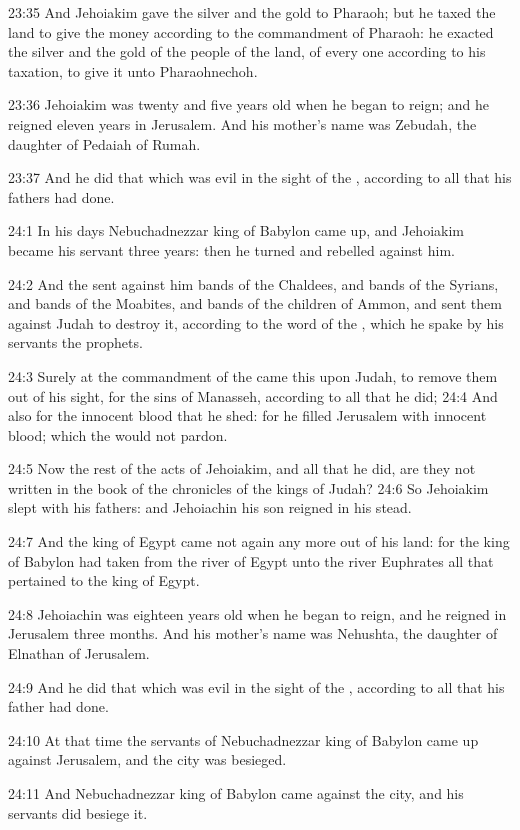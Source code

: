 23:35 And Jehoiakim gave the silver and the gold to Pharaoh; but he
taxed the land to give the money according to the commandment of
Pharaoh: he exacted the silver and the gold of the people of the land,
of every one according to his taxation, to give it unto Pharaohnechoh.

23:36 Jehoiakim was twenty and five years old when he began to reign;
and he reigned eleven years in Jerusalem. And his mother's name was
Zebudah, the daughter of Pedaiah of Rumah.

23:37 And he did that which was evil in the sight of the \LORD,
according to all that his fathers had done.

24:1 In his days Nebuchadnezzar king of Babylon came up, and Jehoiakim
became his servant three years: then he turned and rebelled against
him.

24:2 And the \LORD sent against him bands of the Chaldees, and bands of
the Syrians, and bands of the Moabites, and bands of the children of
Ammon, and sent them against Judah to destroy it, according to the
word of the \LORD, which he spake by his servants the prophets.

24:3 Surely at the commandment of the \LORD came this upon Judah, to
remove them out of his sight, for the sins of Manasseh, according to
all that he did; 24:4 And also for the innocent blood that he shed:
for he filled Jerusalem with innocent blood; which the \LORD would not
pardon.

24:5 Now the rest of the acts of Jehoiakim, and all that he did, are
they not written in the book of the chronicles of the kings of Judah?
24:6 So Jehoiakim slept with his fathers: and Jehoiachin his son
reigned in his stead.

24:7 And the king of Egypt came not again any more out of his land:
for the king of Babylon had taken from the river of Egypt unto the
river Euphrates all that pertained to the king of Egypt.

24:8 Jehoiachin was eighteen years old when he began to reign, and he
reigned in Jerusalem three months. And his mother's name was Nehushta,
the daughter of Elnathan of Jerusalem.

24:9 And he did that which was evil in the sight of the \LORD,
according to all that his father had done.

24:10 At that time the servants of Nebuchadnezzar king of Babylon came
up against Jerusalem, and the city was besieged.

24:11 And Nebuchadnezzar king of Babylon came against the city, and
his servants did besiege it.

